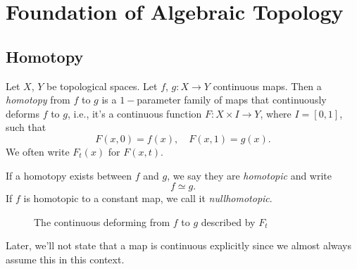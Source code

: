 \section{Foundation of Algebraic Topology}
\subsection{Homotopy}
\begin{definition}\label{def:homotopy,homotopic,nullhomotopic}
	Let \(X\), \(Y\) be topological spaces. Let \(f\), \(g\colon X\to Y\) continuous maps. Then a \emph{homotopy} from \(f\)
	to \(g\) is a \(1-\)parameter family of maps that continuously deforms \(f\) to \(g\), i.e., it's a continuous function
	\(F\colon X\times I\to Y\), where \(I=\left[0,1\right]\), such that
	\[
		F(x, 0) = f(x),\quad F(x, 1) = g(x).
	\]
	We often write \(F_{t}(x)\) for \(F(x, t)\).

	If a homotopy exists between \(f\) and \(g\), we say they are \emph{homotopic} and write
	\[
		f\simeq g.
	\]
	If \(f\) is homotopic to a constant map, we call it \emph{nullhomotopic}.
\end{definition}
\begin{figure}[H]
	\centering
	\caption{The continuous deforming from \(f\) to \(g\) described by \(F_t\)}
	\label{fig:def:homotopy}
\end{figure}

\begin{remark}
	Later, we'll not state that a map is continuous explicitly since we almost always assume this in this context.
\end{remark}


